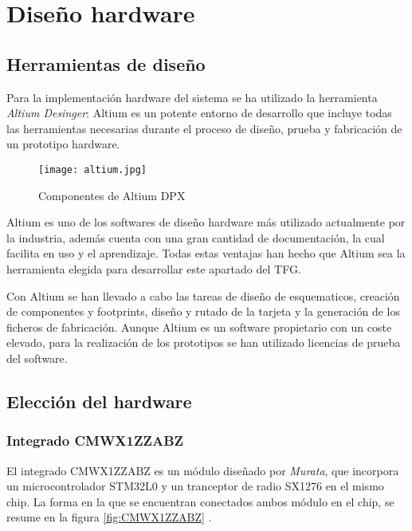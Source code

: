 \chapter{Diseño hardware}
\label{chap:hard}
\graphicspath{{hard/figs/}{hard/figs/}}



\section{Herramientas de diseño}

Para la implementación hardware del sistema se ha utilizado la herramienta \textit{Altium Desinger}: Altium es un potente entorno de desarrollo que incluye todas las herramientas necesarias durante el proceso de diseño, prueba y fabricación de un prototipo hardware.

\begin{figure}[hbt!]
	\centering
	\texttt{[image: altium.jpg]}
	\caption{Componentes de Altium DPX \citep{Altium}}
	\label{fig::altium}
\end{figure}

Altium es uno de los softwares de diseño hardware más utilizado actualmente por la industria, además cuenta con una gran cantidad de documentación, la cual facilita en uso y el aprendizaje. Todas estas ventajas han hecho que Altium sea la herramienta elegida para desarrollar este apartado del TFG.

Con Altium se han llevado a cabo las tareas de diseño de esquematicos, creación de componentes y footprints, diseño y rutado de la tarjeta y la generación de los ficheros de fabricación. Aunque Altium es un software propietario con un coste elevado, para la realización de los prototipos se han utilizado licencias de prueba del software. 



\section{Elección del hardware}
	\subsection{Integrado CMWX1ZZABZ}
	
	El integrado CMWX1ZZABZ es un módulo diseñado por \textit{Murata}, que incorpora un microcontrolador STM32L0 y un tranceptor de radio SX1276 en el mismo chip. La forma en la que se encuentran conectados ambos módulo en el chip, se resume en la figura  \ref{fig:CMWX1ZZABZ} .
	
